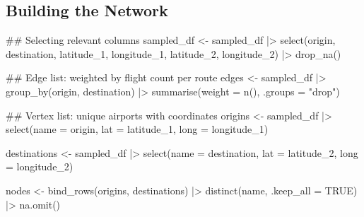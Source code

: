 \documentclass[
  letterpaper,
]{report}
\newenvironment{Shaded}{}{}
\newcommand{\AttributeTok}[1]{\textcolor[rgb]{0.84,0.23,0.29}{#1}}
\newcommand{\ConstantTok}[1]{\textcolor[rgb]{0.00,0.36,0.77}{#1}}
\newcommand{\DocumentationTok}[1]{\textcolor[rgb]{0.42,0.45,0.49}{#1}}
\newcommand{\FunctionTok}[1]{\textcolor[rgb]{0.44,0.26,0.76}{#1}}
\newcommand{\NormalTok}[1]{\textcolor[rgb]{0.14,0.16,0.18}{#1}}
\newcommand{\OtherTok}[1]{\textcolor[rgb]{0.44,0.26,0.76}{#1}}
\newcommand{\SpecialCharTok}[1]{\textcolor[rgb]{0.00,0.36,0.77}{#1}}
\newcommand{\StringTok}[1]{\textcolor[rgb]{0.01,0.18,0.38}{#1}}
\begin{document}
\subsection{Building the Network}\label{building-the-network}

\begin{Shaded}
\begin{Highlighting}[]
\DocumentationTok{\#\# Selecting relevant columns}
\NormalTok{sampled\_df }\OtherTok{\textless{}{-}}\NormalTok{ sampled\_df }\SpecialCharTok{|\textgreater{}}
  \FunctionTok{select}\NormalTok{(origin, destination, latitude\_1, longitude\_1, latitude\_2, longitude\_2) }\SpecialCharTok{|\textgreater{}}
  \FunctionTok{drop\_na}\NormalTok{()}
\end{Highlighting}
\end{Shaded}

\begin{Shaded}
\begin{Highlighting}[]
\DocumentationTok{\#\# Edge list: weighted by flight count per route}
\NormalTok{edges }\OtherTok{\textless{}{-}}\NormalTok{ sampled\_df }\SpecialCharTok{|\textgreater{}}
  \FunctionTok{group\_by}\NormalTok{(origin, destination) }\SpecialCharTok{|\textgreater{}}
  \FunctionTok{summarise}\NormalTok{(}\AttributeTok{weight =} \FunctionTok{n}\NormalTok{(), }\AttributeTok{.groups =} \StringTok{"drop"}\NormalTok{)}
\end{Highlighting}
\end{Shaded}

\begin{Shaded}
\begin{Highlighting}[]
\DocumentationTok{\#\# Vertex list: unique airports with coordinates}
\NormalTok{origins }\OtherTok{\textless{}{-}}\NormalTok{ sampled\_df }\SpecialCharTok{|\textgreater{}}
  \FunctionTok{select}\NormalTok{(}\AttributeTok{name =}\NormalTok{ origin, }\AttributeTok{lat =}\NormalTok{ latitude\_1, }\AttributeTok{long =}\NormalTok{ longitude\_1)}

\NormalTok{destinations }\OtherTok{\textless{}{-}}\NormalTok{ sampled\_df }\SpecialCharTok{|\textgreater{}}
  \FunctionTok{select}\NormalTok{(}\AttributeTok{name =}\NormalTok{ destination, }\AttributeTok{lat =}\NormalTok{ latitude\_2, }\AttributeTok{long =}\NormalTok{ longitude\_2)}

\NormalTok{nodes }\OtherTok{\textless{}{-}} \FunctionTok{bind\_rows}\NormalTok{(origins, destinations) }\SpecialCharTok{|\textgreater{}}
  \FunctionTok{distinct}\NormalTok{(name, }\AttributeTok{.keep\_all =} \ConstantTok{TRUE}\NormalTok{) }\SpecialCharTok{|\textgreater{}}
  \FunctionTok{na.omit}\NormalTok{()}
\end{Highlighting}
\end{Shaded}
\end{document}
